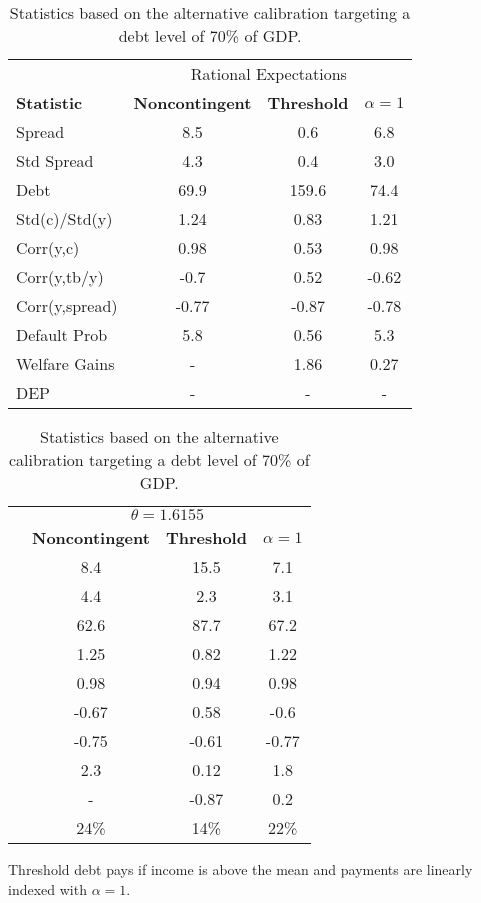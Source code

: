 \begin{table}[!hbtp]\centering\small 
\caption{Statistics based on the alternative calibration targeting a debt level of 70\% of GDP.} \label{table:CE}
\begin{tabular}{@{}lccc@{}}\toprule
  & \multicolumn{3}{c}{Rational Expectations} \\\cmidrule{2-4}
\textbf{Statistic} & \textbf{Noncontingent} & \textbf{Threshold} & $\alpha = 1$\\\midrule
Spread                   & 8.5            & 0.6            & 6.8            \\
Std Spread               & 4.3            & 0.4            & 3.0            \\
Debt                     & 69.9           & 159.6           & 74.4           \\
Std(c)/Std(y)            & 1.24            & 0.83           & 1.21           \\
Corr(y,c)                & 0.98           & 0.53           & 0.98           \\
Corr(y,tb/y)             & -0.7          & 0.52           & -0.62          \\
Corr(y,spread)           & -0.77        & -0.87           & -0.78          \\
Default Prob             & 5.8            & 0.56            & 5.3            \\
Welfare Gains            & -              & 1.86           & 0.27           \\
DEP				      & - 			& - 			& -                  \\
  \bottomrule
\end{tabular}%
\begin{tabular}{@{}lccc@{}}\toprule
  & \multicolumn{3}{c}{$\theta = 1.6155$} \\\cmidrule{2-4}
  & \textbf{Noncontingent} & \textbf{Threshold} & $\alpha = 1$ \\\midrule
& 8.4            & 15.5           & 7.1            \\
& 4.4            & 2.3            & 3.1            \\
& 62.6           & 87.7           & 67.2           \\
& 1.25           & 0.82           & 1.22           \\
& 0.98           & 0.94           & 0.98           \\
& -0.67          & 0.58           & -0.6          \\
& -0.75          & -0.61          & -0.77           \\
& 2.3            & 0.12            & 1.8            \\
& -              & -0.87          & 0.2           \\
& 24\%         & 14\%             & 22\%             \\
\bottomrule
\end{tabular}
\begin{tablenotes1}
  Threshold debt pays if income is above the mean and payments are linearly indexed with $\alpha = 1$.
\end{tablenotes1}
\end{table}

